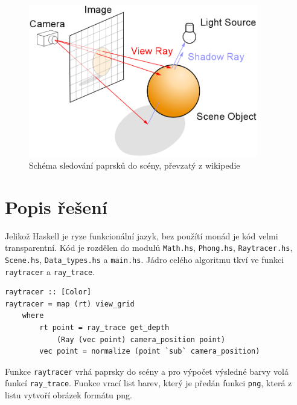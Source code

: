 \documentclass[a4paper, 12pt]{article}
\begin{document}


\begin{figure}[htb]
  \centering
  \includegraphics[width=10cm,keepaspectratio]{Ray_trace_diagram.png}
  \caption{Schéma sledování paprsků do scény, převzatý z wikipedie \cite{wikipedia}}
  \label{fig:raytrace}
\end{figure}


\section{Popis řešení}

Jelikož Haskell je ryze funkcionální jazyk, bez použítí monád je kód velmi transparentní. Kód je rozdělen do modulů
\texttt{Math.hs}, \texttt{Phong.hs}, \texttt{Raytracer.hs}, \texttt{Scene.hs}, \texttt{Data\_types.hs} a \texttt{main.hs}. 
Jádro celého algoritmu tkví ve funkci \texttt{raytracer} a \texttt{ray\_trace}. 

\begin{verbatim}
raytracer :: [Color]
raytracer = map (rt) view_grid
    where
        rt point = ray_trace get_depth 
            (Ray (vec point) camera_position point)
        vec point = normalize (point `sub` camera_position)
\end{verbatim}

Funkce \texttt{raytracer} vrhá paprsky do scény a pro výpočet výsledné barvy volá funkcí \texttt{ray\_trace}. Funkce vrací list barev,
který je předán funkci \texttt{png}, která z listu vytvoří obrázek formátu png.
\end{document}

